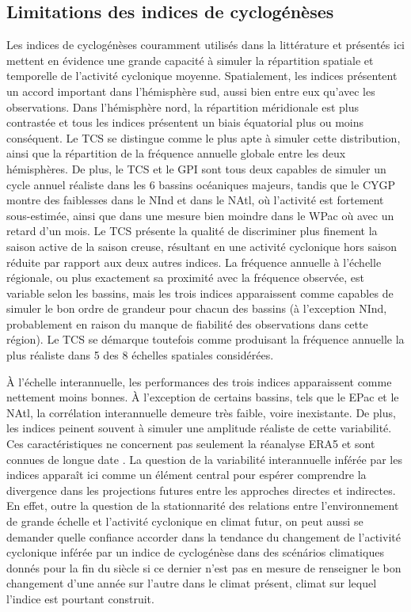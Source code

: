 \documentclass[../main.tex]{subfiles}
\begin{document}
\subsection{Limitations des indices de cyclogénèses}

Les indices de cyclogénèses couramment utilisés dans la littérature et présentés ici mettent en évidence une grande capacité à simuler la répartition spatiale et
temporelle de l'activité cyclonique moyenne. Spatialement, les indices présentent un accord important dans l'hémisphère sud, aussi bien entre eux qu'avec les
observations. Dans l'hémisphère nord, la répartition méridionale est plus contrastée et tous les indices présentent un biais équatorial plus ou moins
conséquent. Le TCS se distingue comme le plus apte à simuler cette distribution, ainsi que la répartition de la fréquence annuelle globale entre les deux
hémisphères. De plus, le TCS et le GPI sont tous deux capables de simuler un cycle annuel réaliste dans les 6 bassins océaniques majeurs, tandis que le CYGP
montre des faiblesses dans le NInd et dans le NAtl, où l'activité est fortement sous-estimée, ainsi que dans une mesure bien moindre dans le WPac où avec un
retard d'un mois. Le TCS présente la qualité de discriminer plus finement la saison active de la saison creuse, résultant en une activité cyclonique hors saison
réduite par rapport aux deux autres indices. La fréquence annuelle à l'échelle régionale, ou plus exactement sa proximité avec la fréquence observée, est
variable selon les bassins, mais les trois indices apparaissent comme capables de simuler le bon ordre de grandeur pour chacun des bassins (à l'exception NInd,
probablement en raison du manque de fiabilité des observations dans cette région). Le TCS se démarque toutefois comme produisant la fréquence annuelle la plus
réaliste dans 5 des 8 échelles spatiales considérées.

À l'échelle interannuelle, les performances des trois indices apparaissent comme nettement moins bonnes. À l'exception de certains bassins, tels que le EPac et
le NAtl, la corrélation interannuelle demeure très faible, voire inexistante. De plus, les indices peinent souvent à simuler une amplitude réaliste de cette
variabilité. Ces caractéristiques ne concernent pas seulement la réanalyse ERA5 et sont connues de longue date
\parencite{watterson_seasonal_1995,camargo_tropical_2007,tippett_poisson_2011,menkes_comparison_2012,wang_dynamic_2020,cavicchia_tropical_2023a}. La question de
la variabilité interannuelle inférée par les indices apparaît ici comme un élément central pour espérer comprendre la divergence dans les projections futures
entre les approches directes et indirectes. En effet, outre la question de la stationnarité des relations entre l'environnement de grande échelle et l'activité
cyclonique en climat futur, on peut aussi se demander quelle confiance accorder dans la tendance du changement de l'activité cyclonique inférée par un indice de
cyclogénèse dans des scénários climatiques donnés pour la fin du siècle si ce dernier n'est pas en mesure de renseigner le bon changement d'une année sur
l'autre dans le climat présent, climat sur lequel l'indice est pourtant construit.
\end{document}
